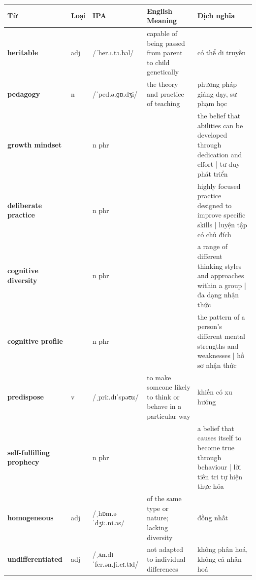 \vspace{0.8em}
\begin{center}
\renewcommand{\arraystretch}{1.65}
\begin{tabularx}{\textwidth}{|V{0.22\textwidth}|C{0.07\textwidth}|I{0.20\textwidth}|Y|V{0.18\textwidth}|}
\hline
{}
\textbf{Từ} & \textbf{Loại} & \textbf{IPA} & \textbf{English Meaning} & \textbf{Dịch nghĩa} \\
\hline
\textbf{heritable} & adj & /ˈher.ɪ.tə.bəl/ & capable of being passed from parent to child genetically & có thể di truyền \\ \hline
\textbf{pedagogy} & n & /ˈped.ə.ɡɒ.dʒi/ & the theory and practice of teaching & phương pháp giảng dạy, sư phạm học \\ \hline
\textbf{growth mindset} & & n phr & & the belief that abilities can be developed through dedication and effort | tư duy phát triển \\ \hline
\textbf{deliberate practice} & & n phr & & highly focused practice designed to improve specific skills | luyện tập có chủ đích \\ \hline
\textbf{cognitive diversity} & & n phr & & a range of different thinking styles and approaches within a group | đa dạng nhận thức \\ \hline
\textbf{cognitive profile} & & n phr & & the pattern of a person's different mental strengths and weaknesses | hồ sơ nhận thức \\ \hline
\textbf{predispose} & v & /ˌpriː.dɪˈspəʊz/ & to make someone likely to think or behave in a particular way & khiến có xu hướng \\ \hline
\textbf{self-fulfilling prophecy} & & n phr & & a belief that causes itself to become true through behaviour | lời tiên tri tự hiện thực hóa \\ \hline
\textbf{homogeneous} & adj & /ˌhɒm.əˈdʒiː.ni.əs/ & of the same type or nature; lacking diversity & đồng nhất \\ \hline
\textbf{undifferentiated} & adj & /ˌʌn.dɪˈfer.ən.ʃi.eɪ.tɪd/ & not adapted to individual differences & không phân hoá, không cá nhân hoá \\ \hline
\end{tabularx}
\end{center}

\newpage

